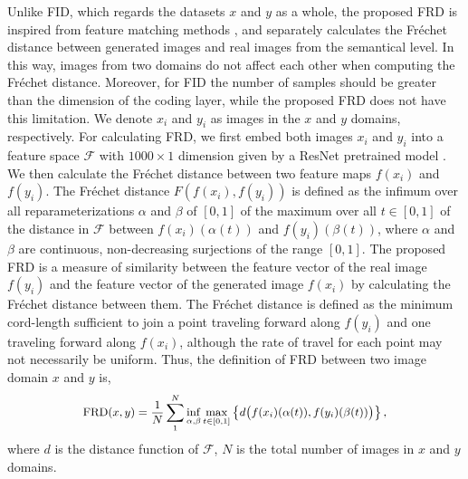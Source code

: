 \documentclass[sigconf]{acmart}
\begin{document}
Unlike FID, which regards the datasets $x$ and $y$ as a  whole, the proposed FRD  is inspired from feature matching methods \cite{tang2016novel,zheng2014packing,zheng2014bayes}, and separately calculates the Fr\'echet distance between generated images and real images from the semantical level.
In this way, images from two domains do not affect each other when computing the Fr\'echet distance.  
Moreover, for FID the number of samples should be greater than the dimension of the coding layer, while the proposed FRD does not have this limitation. 
We denote $x_i$ and $y_i$ as images in the  $x$ and $y$ domains, respectively.
For calculating FRD, we first embed both images $x_i$ and $y_i$ into a feature space $\mathcal{F}$ with $1000{\times}1$ dimension given by a ResNet pretrained model \cite{he2016deep}.
We then calculate the Fr\'echet distance between two feature maps $f(x_i)$ and $f(y_i)$.
The Fr\'echet distance $F(f(x_i),f(y_i))$ is defined as the infimum over all reparameterizations $\alpha$ and $\beta$ of $[0, 1]$ of the maximum over all $t \in [0, 1]$ of the distance in $\mathcal{F}$ between $f(x_i)(\alpha(t))$ and $f(y_i)(\beta(t))$, where $\alpha$ and $\beta$ are continuous, non-decreasing surjections of the range $[0,1]$.
The proposed FRD is a measure of similarity between the feature vector of the real image $f(y_i)$  and the feature vector of the generated image $f(x_i)$ by calculating the Fr\'echet distance between them. The Fr\'echet distance is defined as the minimum cord-length sufficient to join a point traveling forward along $f(y_i)$ and one traveling forward along $f(x_i)$, although the rate of travel for each point may not necessarily be uniform. 
Thus, the definition of FRD between two image domain $x$ and $y$ is,
\begin{equation} \small
\begin{aligned}
\mathrm{FRD}(x, y) = \frac{1}{N} \sum_1^N \inf\limits_{\alpha, \beta} \max\limits_{t \in\left[0, 1\right]} \left\lbrace  d \big(f(x_i) (\alpha (t) ), f(y_i) (\beta(t)) \big) \right\rbrace , 
\end{aligned}
\label{eqn:frd}
\end{equation}
where $d$ is the distance function of $\mathcal{F}$, $N$ is the total number of images in $x$ and $y$ domains.
\end{document}
